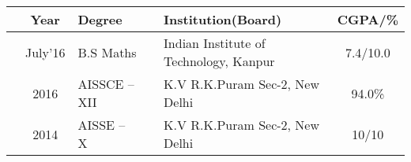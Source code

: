 

\newcommand{\education}[4]{
  & #1 & #2 & &#3 & #4
}
\begin{tabular}{ | L{0.02cm} c | L{3cm} | L{0.05cm} C{8cm} | c |}
  \hline
  \education{\textbf{Year}}{\textbf{Degree}}{\textbf{Institution(Board)}}{\textbf{CGPA/\%}}\\
  \hline
  \education{July'16}{B.S Maths}{Indian Institute of Technology, Kanpur}{7.4/10.0}\\
  \education{2016}{AISSCE -- XII}{K.V R.K.Puram Sec-2, New Delhi}{94.0\%}\\
  \education{2014}{AISSE -- X}{K.V R.K.Puram Sec-2, New Delhi}{10/10}\\
  \hline
\end{tabular}

